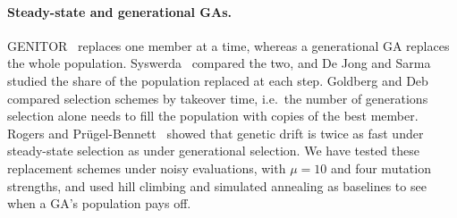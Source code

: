 \paragraph{Steady-state and generational GAs.} GENITOR~\cite{whitley1989genitor} replaces one member at a time, whereas a generational GA replaces the whole population. Syswerda~\cite{syswerda1991study} compared the two, and De Jong and Sarma~\cite{dejong1993generation} studied the share of the population replaced at each step. Goldberg and Deb~\cite{goldberg1991comparative} compared selection schemes by takeover time, i.e.\ the number of generations selection alone needs to fill the population with copies of the best member. Rogers and Pr\"ugel-Bennett~\cite{rogers1999genetic} showed that genetic drift is twice as fast under steady-state selection as under generational selection. We have tested these replacement schemes under noisy evaluations, with $\mu = 10$ and four mutation strengths, and used hill climbing and simulated annealing as baselines to see when a GA's population pays off.
